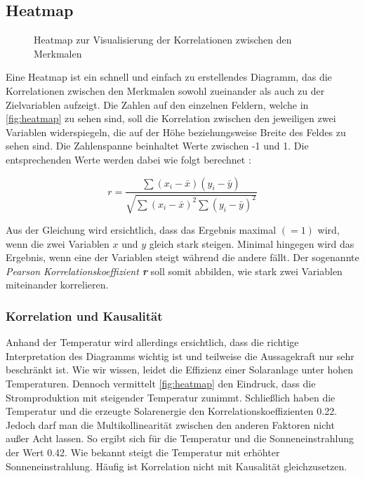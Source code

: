 \documentclass[12pt, a4paper]{article}
\begin{document}
\subsection{Heatmap}

\begin{figure}[H]
\centering
\def\svgwidth{375pt}

\caption{Heatmap zur Visualisierung der Korrelationen zwischen den Merkmalen}
\label{fig:heatmap}
\end {figure}

Eine Heatmap ist ein schnell und einfach zu erstellendes Diagramm, das die Korrelationen zwischen den Merkmalen sowohl zueinander als auch zu der Zielvariablen aufzeigt. Die Zahlen auf den einzelnen Feldern, welche in \autoref{fig:heatmap} zu sehen sind, soll die Korrelation zwischen den jeweiligen zwei Variablen widerspiegeln, die auf der Höhe beziehungsweise Breite des Feldes zu sehen sind. Die Zahlenspanne beinhaltet Werte zwischen -1 und 1. Die entsprechenden Werte werden dabei wie folgt berechnet \cite{ws:vitalflux}:

\begin{equation}
r=\frac{\sum(x_i - \bar{x})(y_i - \bar{y})}
{\sqrt{\sum(x_i - \bar{x})^2\sum(y_i -  \bar{y})^2}}
\end{equation}


Aus der Gleichung wird ersichtlich, dass das Ergebnis maximal $(=1)$ wird, wenn die zwei Variablen $x$ und $y$ gleich stark steigen. Minimal hingegen wird das Ergebnis, wenn eine der Variablen steigt während die andere fällt. Der sogenannte \textit{Pearson Korrelationskoeffizient \textbf{r}} soll somit abbilden, wie stark zwei Variablen miteinander korrelieren. 

\subsubsection{Korrelation und Kausalität}

Anhand der Temperatur wird allerdings ersichtlich, dass die richtige Interpretation des Diagramms wichtig ist und teilweise die Aussagekraft nur sehr beschränkt ist. Wie wir wissen, leidet die Effizienz einer Solaranlage unter hohen Temperaturen. Dennoch vermittelt \autoref{fig:heatmap} den Eindruck, dass die Stromproduktion mit steigender Temperatur zunimmt. Schließlich haben die Temperatur und die erzeugte Solarenergie den Korrelationskoeffizienten 0.22. Jedoch darf man die Multikollinearität zwischen den anderen Faktoren nicht außer Acht lassen. So ergibt sich für die Temperatur und die Sonneneinstrahlung der Wert 0.42. Wie bekannt steigt die Temperatur mit erhöhter Sonneneinstrahlung. Häufig ist Korrelation nicht mit Kausalität gleichzusetzen.
\end{document}
